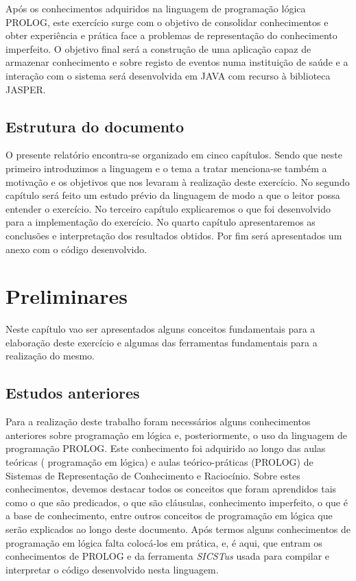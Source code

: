 Após os conhecimentos adquiridos na linguagem de programação lógica PROLOG, este exercício surge com o objetivo de consolidar conhecimentos e obter experiência e prática face a problemas de representação do conhecimento imperfeito. O objetivo final será a construção de uma  aplicação capaz de armazenar conhecimento e sobre registo de eventos numa instituição de saúde e a interação com o sistema será desenvolvida em JAVA com recurso à biblioteca JASPER.



\section{Estrutura do documento}
\label{p1:Estrutura}
O presente relatório encontra-se organizado em cinco capítulos. Sendo que neste primeiro introduzimos a linguagem e o tema a tratar menciona-se também a motivação e os objetivos que nos levaram à realização deste exercício. 
No segundo capítulo será feito um estudo prévio da linguagem de modo a que o leitor possa entender o exercício. No terceiro capítulo explicaremos o que foi desenvolvido para a implementação do exercício. No quarto capítulo apresentaremos as conclusões e interpretação dos resultados obtidos. Por fim será apresentados um anexo com o código desenvolvido. 



\chapter{Preliminares}
\label{cap:p2}
Neste capítulo vao ser apresentados alguns conceitos fundamentais para a elaboração deste exercício e algumas das ferramentas fundamentais para a realização do mesmo.


\section{Estudos anteriores}
\label{p2:estudp}
Para a realização deste trabalho foram necessários alguns conhecimentos anteriores sobre programação em lógica e, posteriormente, o uso da linguagem de programação PROLOG.
Este conhecimento foi adquirido ao longo das aulas teóricas ( programação em lógica) e aulas teórico-práticas (PROLOG) de Sistemas de Representação de Conhecimento e Raciocínio.
Sobre estes conhecimentos, devemos destacar todos os conceitos que foram aprendidos tais como o que são predicados, o que são cláusulas, conhecimento imperfeito, o que é a base de conhecimento, entre outros conceitos de programação em lógica que serão explicados ao longo deste documento.
Após termos alguns conhecimentos de programação em lógica falta colocá-los em prática, e, é aqui, que entram os conhecimentos de PROLOG e da ferramenta \textit{SICSTus} usada para
compilar e interpretar o código desenvolvido nesta linguagem.


